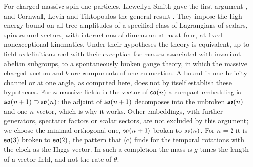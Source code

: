 For charged massive spin-one particles, Llewellyn Smith gave the first argument \cite{LlewellynSmith73}, and Cornwall, Levin and
Tiktopoulos the general result \cite{CornwallLevinTiktopoulos74}. They impose the high-energy bound on all tree amplitudes of a specified
class of Lagrangians of scalars, spinors and vectors, with interactions of dimension at most four, at fixed nonexceptional kinematics. Under
their hypotheses the theory is equivalent, up to field redefinitions and with their exception for masses associated with invariant abelian
subgroups, to a spontaneously broken gauge theory, in which the massive charged vectors and $b$ are components of one connection. A bound
in one helicity channel or at one angle, as computed here, does not by itself establish these hypotheses. For $n$ massive fields in the vector of $\mathfrak{so}(n)$ a compact embedding is $\mathfrak{so}(n+1)\supset\mathfrak{so}(n)$: the adjoint of $\mathfrak{so}(n+1)$
decomposes into the unbroken $\mathfrak{so}(n)$ and one $n$-vector, which is why it works. Other embeddings, with further generators, spectator factors
or scalar sectors, are not excluded by this argument; we choose the minimal orthogonal one, $\mathfrak{so}(n+1)$ broken to $\mathfrak{so}(n)$. For $n=2$ it is
$\mathfrak{so}(3)$ broken to $\mathfrak{so}(2)$, the pattern that (c) finds for the temporal rotations with the clock as the Higgs vector. In such a
completion the mass is $g$ times the length of a vector field, and not the rate of $\theta$.
